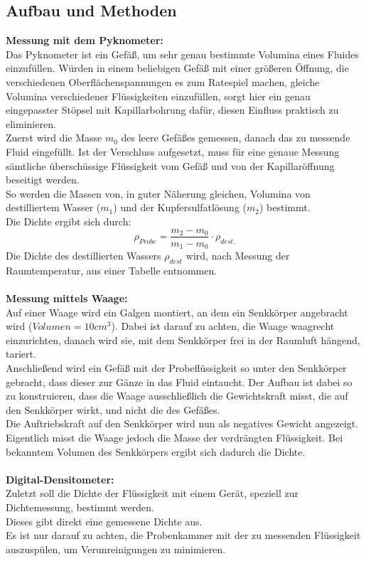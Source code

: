 \documentclass[12pt,a4paper]{article}
\begin{document}
\begin{multicols}{2}
\subsection{Aufbau und Methoden}
\textbf{Messung mit dem Pyknometer:}\\
Das Pyknometer ist ein Gefäß, um sehr genau bestimmte Volumina eines Fluides einzufüllen. Würden in einem beliebigen Gefäß mit einer größeren Öffnung, die verschiedenen Oberflächenspannungen es zum Ratespiel machen, gleiche Volumina verschiedener Flüssigkeiten einzufüllen, sorgt hier ein genau eingepasster Stöpsel mit Kapillarbohrung dafür, diesen Einfluss praktisch zu eliminieren.\\
Zuerst wird die Masse $m_0$ des leere Gefäßes gemessen, danach das zu messende Fluid eingefüllt. Ist der Verschluss aufgesetzt, muss für eine genaue Messung sämtliche überschüssige Flüssigkeit vom Gefäß und von der Kapillaröffnung beseitigt werden.\\
So werden die Massen von, in guter Näherung gleichen, Volumina von destilliertem Wasser ($m_1$) und der Kupfersulfatlösung ($m_2$) bestimmt.\\
Die Dichte ergibt sich durch:
$$\rho_{Probe}=\frac{m_2-m_0}{m_1-m_0}\cdot \rho_{dest.}$$
Die Dichte des destillierten Wassers $\rho_{dest}$ wird, nach Messung der Raumtemperatur, aus einer Tabelle entnommen.\\
\\
\textbf{Messung mittels Waage:}\\
Auf einer Waage wird ein Galgen montiert, an dem ein Senkkörper angebracht wird ($Volumen=10cm^3$). Dabei ist darauf zu achten, die Waage waagrecht einzurichten, danach wird sie, mit dem Senkkörper frei in der Raumluft hängend, tariert.\\
Anschließend wird ein Gefäß mit der Probeflüssigkeit so unter den Senkkörper gebracht, dass dieser zur Gänze in das Fluid eintaucht. Der Aufbau ist dabei so zu konstruieren, dass die Waage ausschließlich die Gewichtskraft misst, die auf den Senkkörper wirkt, und nicht die des Gefäßes.\\
Die Auftriebskraft auf den Senkkörper wird nun als negatives Gewicht angezeigt. Eigentlich misst die Waage jedoch die Masse der verdrängten Flüssigkeit. Bei bekanntem Volumen des Senkkörpers ergibt sich dadurch die Dichte.\\
\\
\textbf{Digital-Densitometer:}\\
Zuletzt soll die Dichte der Flüssigkeit mit einem Gerät, speziell zur Dichtemessung, bestimmt werden.\\
Dieses gibt direkt eine gemessene Dichte aus.\\
Es ist nur darauf zu achten, die Probenkammer mit der zu messenden Flüssigkeit auszuspülen, um Verunreinigungen zu minimieren.


\end{multicols}
\end{document}
